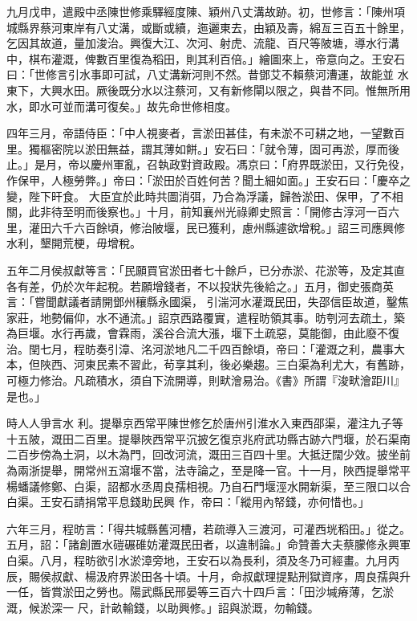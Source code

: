 \begin{pinyinscope}
 九月戊申，遣殿中丞陳世修乘驛經度陳、穎州八丈溝故跡。初，世修言：「陳州項城縣界蔡河東岸有八丈溝，或斷或續，迤邐東去，由穎及壽，綿亙三百五十餘里，乞因其故道，量加浚治。興復大江、次河、射虎、流龍、百尺等陂塘，導水行溝中，棋布灌溉，俾數百里復為稻田，則其利百倍。」繪圖來上，帝意向之。王安石曰：「世修言引水事即可試，八丈溝新河則不然。昔鄧艾不賴蔡河漕運，故能並
 水東下，大興水田。厥後既分水以注蔡河，又有新修閘以限之，與昔不同。惟無所用水，即水可並而溝可復矣。」故先命世修相度。



 四年三月，帝語侍臣：「中人視麥者，言淤田甚佳，有未淤不可耕之地，一望數百里。獨樞密院以淤田無益，謂其薄如餅。」安石曰：「就令薄，固可再淤，厚而後止。」是月，帝以慶州軍亂，召執政對資政殿。馮京曰：「府界既淤田，又行免役，作保甲，人極勞弊。」帝曰：「淤田於百姓何苦？聞土細如面。」王安石曰：「慶卒之變，陛下旰食。
 大臣宜於此時共圖消弭，乃合為浮議，歸咎淤田、保甲，了不相關，此非待至明而後察也。」十月，前知襄州光祿卿史照言：「開修古淳河一百六里，灌田六千六百餘頃，修治陂堰，民已獲利，慮州縣遽欲增稅。」詔三司應興修水利，墾開荒梗，毋增稅。



 五年二月侯叔獻等言：「民願買官淤田者七十餘戶，已分赤淤、花淤等，及定其直各有差，仍於次年起稅。若願增錢者，不以投狀先後給之。」五月，御史張商英言：「嘗聞獻議者請開鄧州穰縣永國渠，
 引湍河水灌溉民田，失邵信臣故道，鑿焦家莊，地勢偏仰，水不通流。」詔京西路覆實，遣程昉領其事。昉刳河去疏土，築為巨堰。水行再歲，會霖雨，溪谷合流大漲，堰下土疏惡，莫能御，由此廢不復治。閏七月，程昉奏引漳、洺河淤地凡二千四百餘頃，帝曰：「灌溉之利，農事大本，但陜西、河東民素不習此，茍享其利，後必樂趨。三白渠為利尤大，有舊跡，可極力修治。凡疏積水，須自下流開導，則畎澮易治。《書》所謂『浚畎澮距川』是也。」



 時人人爭言水
 利。提舉京西常平陳世修乞於唐州引淮水入東西邵渠，灌注九子等十五陂，溉田二百里。提舉陜西常平沉披乞復京兆府武功縣古跡六門堰，於石渠南二百步傍為土洞，以木為門，回改河流，溉田三百四十里。大抵迂闊少效。披坐前為兩浙提舉，開常州五瀉堰不當，法寺論之，至是降一官。十一月，陜西提舉常平楊蟠議修鄭、白渠，詔都水丞周良孺相視。乃自石門堰涇水開新渠，至三限口以合白渠。王安石請捐常平息錢助民興
 作，帝曰：「縱用內帑錢，亦何惜也。」



 六年三月，程昉言：「得共城縣舊河槽，若疏導入三渡河，可灌西垙稻田。」從之。五月，詔：「諸創置水磑碾碓妨灌溉民田者，以違制論。」命贊善大夫蔡朦修永興軍白渠。八月，程昉欲引水淤漳旁地，王安石以為長利，須及冬乃可經畫。九月丙辰，賜侯叔獻、楊汲府界淤田各十頃。十月，命叔獻理提點刑獄資序，周良孺與升一任，皆賞淤田之勞也。陽武縣民邢晏等三百六十四戶言：「田沙堿瘠薄，乞淤溉，候淤深一
 尺，計畝輸錢，以助興修。」詔與淤溉，勿輸錢。




\end{pinyinscope}
